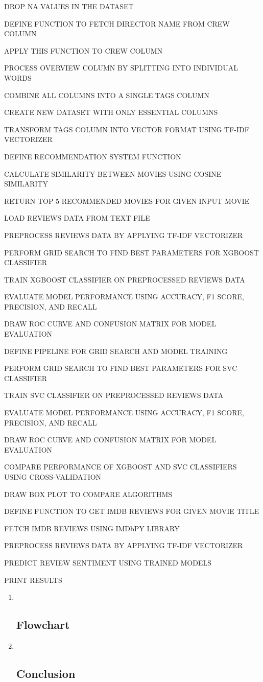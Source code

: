 \documentclass[
]{article}
\begin{document}
DROP NA VALUES IN THE DATASET

DEFINE FUNCTION TO FETCH DIRECTOR NAME FROM CREW COLUMN

APPLY THIS FUNCTION TO CREW COLUMN

PROCESS OVERVIEW COLUMN BY SPLITTING INTO INDIVIDUAL WORDS

COMBINE ALL COLUMNS INTO A SINGLE TAGS COLUMN

CREATE NEW DATASET WITH ONLY ESSENTIAL COLUMNS

TRANSFORM TAGS COLUMN INTO VECTOR FORMAT USING TF-IDF VECTORIZER

DEFINE RECOMMENDATION SYSTEM FUNCTION

CALCULATE SIMILARITY BETWEEN MOVIES USING COSINE SIMILARITY

RETURN TOP 5 RECOMMENDED MOVIES FOR GIVEN INPUT MOVIE

LOAD REVIEWS DATA FROM TEXT FILE

PREPROCESS REVIEWS DATA BY APPLYING TF-IDF VECTORIZER

PERFORM GRID SEARCH TO FIND BEST PARAMETERS FOR XGBOOST CLASSIFIER

TRAIN XGBOOST CLASSIFIER ON PREPROCESSED REVIEWS DATA

EVALUATE MODEL PERFORMANCE USING ACCURACY, F1 SCORE, PRECISION, AND
RECALL

DRAW ROC CURVE AND CONFUSION MATRIX FOR MODEL EVALUATION

DEFINE PIPELINE FOR GRID SEARCH AND MODEL TRAINING

PERFORM GRID SEARCH TO FIND BEST PARAMETERS FOR SVC CLASSIFIER

TRAIN SVC CLASSIFIER ON PREPROCESSED REVIEWS DATA

EVALUATE MODEL PERFORMANCE USING ACCURACY, F1 SCORE, PRECISION, AND
RECALL

DRAW ROC CURVE AND CONFUSION MATRIX FOR MODEL EVALUATION

COMPARE PERFORMANCE OF XGBOOST AND SVC CLASSIFIERS USING
CROSS-VALIDATION

DRAW BOX PLOT TO COMPARE ALGORITHMS

DEFINE FUNCTION TO GET IMDB REVIEWS FOR GIVEN MOVIE TITLE

FETCH IMDB REVIEWS USING IMDbPY LIBRARY

PREPROCESS REVIEWS DATA BY APPLYING TF-IDF VECTORIZER

PREDICT REVIEW SENTIMENT USING TRAINED MODELS

PRINT RESULTS

\begin{enumerate}
\def\labelenumi{\arabic{enumi}.}
\setcounter{enumi}{5}
\item ~
  \hypertarget{flowchart}{%
  \subsection{Flowchart}\label{flowchart}}
\item ~
  \hypertarget{conclusion}{%
  \subsection{Conclusion}\label{conclusion}}
\end{enumerate}
\end{document}
